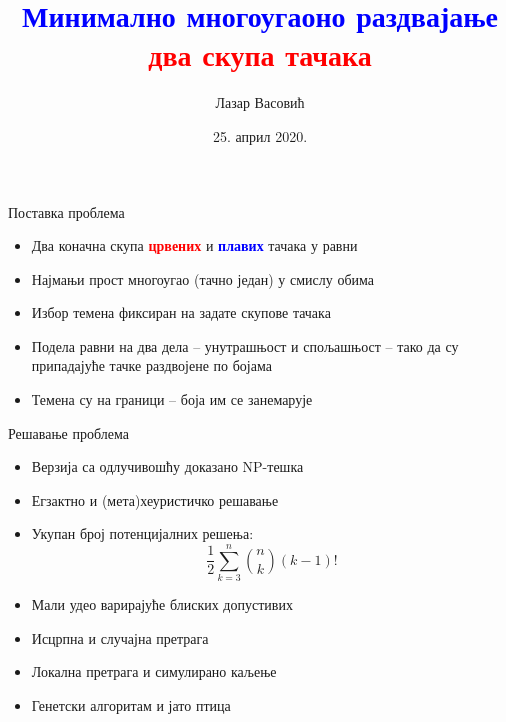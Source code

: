 \documentclass{beamer}
\title{\textbf{\textcolor{blue}{Минимално многоугаоно раздвајање} \textcolor{red}{два скупа тачака}}}
\author{Лазар Васовић}
\institute{Математички факултет, Универзитет у Београду}
\date{25. април 2020.}
\begin{document}
\frame{\titlepage}

\begin{frame}{Поставка проблема}
\begin{itemize}
\item Два коначна скупа \textbf{\textcolor{red}{црвених}} и \textbf{\textcolor{blue}{плавих}} тачака у равни

\item Најмањи прост многоугао (тачно један) у смислу обима

\item Избор темена фиксиран на задате скупове тачака

\item Подела равни на два дела -- унутрашњост и спољашњост -- тако да су припадајуће тачке раздвојене по бојама

\item Темена су на граници -- боја им се занемарује
\end{itemize}
\end{frame}

{
\begin{frame}
\end{frame}
}

\begin{frame}{Решавање проблема}
\begin{itemize}
\item Верзија са одлучивошћу доказано NP-тешка

\item Егзактно и (мета)хеуристичко решавање

\item Укупан број потенцијалних решења: $$\frac{1}{2} \sum_{k=3}^{n} {n \choose k} (k-1)!$$

\item Мали удео варирајуће блиских допустивих

\item Исцрпна и случајна претрага

\item Локална претрага и симулирано каљење

\item Генетски алгоритам и јато птица
\end{itemize}
\end{frame}
\end{document}
